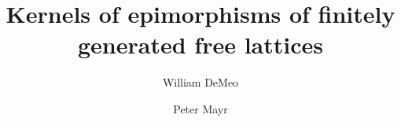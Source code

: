 \newcommand{\mysetminus}{\ensuremath{-}}

\usepackage[yyyymmdd,hhmmss]{datetime}
\usepackage{background}


\usepackage{pdfcomment}
\usepackage{color}
\usepackage{amsmath}
\usepackage{amssymb}
\usepackage{amsfonts}
\usepackage{mathtools}
\usepackage{amscd}
\usepackage{inputs/wjdlatexmacs}

\usepackage[mathcal]{euscript}
\usepackage{comment}
\usepackage{tikz}
\usetikzlibrary{math} %

\renewcommand{\th}[2]{#1\mathrel{\theta}#2}
\newcommand{\infixrel}[3]{#2\mathrel{#1}#3}
\newcommand\llb{\ensuremath{\llbracket}}
\newcommand\rrb{\ensuremath{\rrbracket}}

\theoremstyle{plain}
\newtheorem{theorem}{Theorem}[section]
\newtheorem{lemma}[theorem]{Lemma}
\newtheorem{proposition}[theorem]{Proposition}
\newtheorem{prop}[theorem]{Prop.}
\theoremstyle{definition}
\newtheorem{conjecture}{Conjecture}
\newtheorem{claim}[theorem]{Claim}
\newtheorem{subclaim}{Subclaim}
\newtheorem{corollary}[theorem]{Corollary}
\newtheorem{definition}[theorem]{Definition}
\newtheorem{notation}[theorem]{Notation}
\newtheorem{Fact}[theorem]{Fact}
\newtheorem*{fact}{Fact}
\newtheorem{example}[theorem]{Example}
\newtheorem{examples}[theorem]{Examples}
\newtheorem{exercise}{Exercise}
\newtheorem*{lem}{Lemma}
\newtheorem*{cor}{Corollary}
\newtheorem*{remark}{Remark}
\newtheorem*{remarks}{Remarks}
\newtheorem*{obs}{Observation}

\title[Kernels of Lattice Epimorphisms]{Kernels of epimorphisms of finitely generated free lattices}
\author[W.~DeMeo]{William DeMeo}

\author[P.~Mayr]{Peter Mayr}

